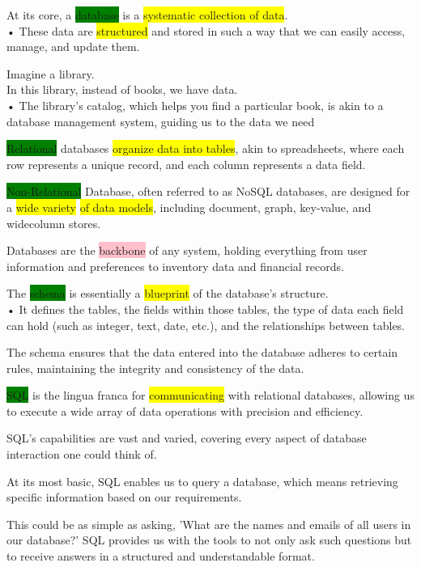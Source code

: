 \documentclass[]{project_plan}
\begin{document}
At its core, a \colorbox{green}{database} is a \colorbox{yellow}{systematic collection of data}.\\
• These data are \colorbox{yellow}{structured} and stored in such a way that we can easily access,
manage, and update them.

Imagine a library.\\
In this library, instead of books, we have data.\\
• The library's catalog, which helps you find a particular book, is akin to a database
management system, guiding us to the data we need

\colorbox{green}{Relational} databases \colorbox{yellow}{organize data into tables}, akin to spreadsheets, where each
row represents a unique record, and each column represents a data field.

\colorbox{green}{Non-Relational} Database, often referred to as NoSQL databases, are designed for a
\colorbox{yellow}{wide variety} \colorbox{yellow}{of data models}, including document, graph, key-value, and widecolumn stores.

Databases are the \colorbox{pink}{backbone} of any system, holding everything from user
information and preferences to inventory data and financial records.

The \colorbox{green}{schema} is essentially a \colorbox{yellow}{blueprint} of the database's structure.\\
• It defines the tables, the fields within those tables, the type of data each
field can hold (such as integer, text, date, etc.), and the relationships
between tables.

The schema ensures that the data entered into the database adheres to
certain rules, maintaining the integrity and consistency of the data.

\colorbox{green}{SQL} is the lingua franca for \colorbox{yellow}{communicating} with relational databases, allowing us
to execute a wide array of data operations with precision and efficiency.

SQL's capabilities are vast and varied, covering every aspect of database interaction
one could think of.

At its most basic, SQL enables us to query a database, which means retrieving
specific information based on our requirements.

This could be as simple as asking, 'What are the names and emails of all users in our
database?' SQL provides us with the tools to not only ask such questions but to
receive answers in a structured and understandable format.
\end{document}
